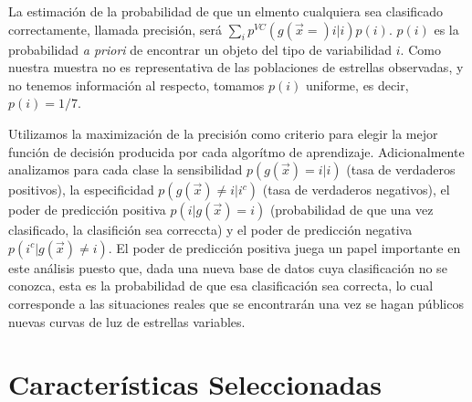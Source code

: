 \documentclass[letterpaper,12pt]{book}
\begin{document}
La estimación de la probabilidad de que un elmento cualquiera sea clasificado correctamente, llamada precisión,  será $\sum_{i}p^{VC}(g(\vec{x}=)i|i)p(i)$. $p(i)$ es la probabilidad \textit{a priori} de encontrar un objeto del tipo de variabilidad $i$. Como nuestra muestra no es representativa de las poblaciones de estrellas observadas, y no tenemos información al respecto, tomamos $p(i)$ uniforme, es decir, $p(i) = 1/7$.

Utilizamos la maximización de la precisión como criterio para elegir la mejor función de decisión producida por cada algorítmo de aprendizaje. Adicionalmente analizamos para cada clase la sensibilidad $p(g(\vec{x})=i|i)$ (tasa de verdaderos positivos),  la especificidad $p(g(\vec{x})\neq i|i^c)$ (tasa de verdaderos negativos), el poder de predicción positiva $p(i|g(\vec{x})=i)$ (probabilidad de que una vez clasificado, la clasifición sea correccta) y el poder de predicción negativa $p(i^c|g(\vec{x})\neq i)$. El poder de predicción positiva juega un papel importante en este análisis puesto que, dada una nueva base de datos cuya clasificación no se conozca, esta es la probabilidad de que esa clasificación sea correcta, lo cual corresponde a las situaciones reales que se encontrarán una vez se hagan públicos nuevas curvas de luz de estrellas variables. 




\section{Características Seleccionadas \label{sec:atributos}}
\end{document}
